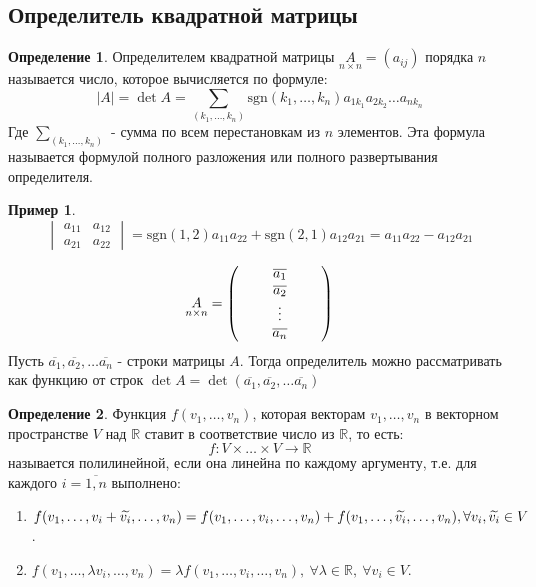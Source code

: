 \documentclass[a4paper, 12pt]{article}
\newcommand{\R}{\mathbb R}
\newcommand\tab[1][.5cm]{\hspace*{#1}}
\theoremstyle{definition}
\newtheorem*{definition}{Определение}
\newtheorem*{example1}{Пример}
\begin{document}
  \subsection{Определитель квадратной матрицы}
  \begin{definition}
    Определителем квадратной матрицы $\underset{n \times n}{A}=(a_{ij})$ порядка $n$ называется число, которое вычисляется по формуле:
    $$|A|=\det{A}=\sum\limits_{(k_1,\dots,k_n)}\textrm{sgn}(k_1,\dots,k_n)a_{1k_1}a_{2k_2}\dots a_{nk_n}$$
    Где $\sum\limits_{(k_1,\dots,k_n)}$ - сумма по всем перестановкам из $n$ элементов. Эта формула называется формулой полного разложения или полного развертывания определителя.
  \end{definition}
  \begin{example1}
    $$\begin{vmatrix}
      a_{11} & a_{12}\\
      a_{21} & a_{22}  
    \end{vmatrix} = \textrm{sgn}(1,2)a_{11}a_{22}+\textrm{sgn}(2,1)a_{12}a_{21}=a_{11}a_{22}-a_{12}a_{21}$$
  \end{example1}
  $$\underset{n \times n}{A}=\begin{pmatrix}
    \tab & \overline{a_1} & \tab\\
    \null & \overline{a_2} & \null\\
    \null & \vdots & \null\\
    \null & \overline{a_n} & \null
  \end{pmatrix}$$
  Пусть $\overline{a_1}, \overline{a_2}, \dots \overline{a_n}$ - строки матрицы $A$. Тогда определитель можно рассматривать как функцию от строк $\det{A}=\det{(\overline{a_1},\overline{a_2},\dots \overline{a_n})}$
  \begin{definition}
    Функция $f(v_1,\dots, v_n)$, которая векторам $v_1,\dots, v_n$ в векторном пространстве $V$ над $\R$ ставит в соответствие число из $\R$, то есть: $$f:V\times\dots\times V\to \R$$
    называется полилинейной, если она линейна по каждому аргументу, т.е. для каждого $i=\overline{1,n}$ выполнено:
    \begin{enumerate}
      \item $f(v_1,\dots, v_i+\widetilde{v_i},\dots, v_n)=f(v_1,\dots, v_i,\dots, v_n)+f(v_1,\dots, \widetilde{v_i},\dots, v_n),\\ \forall v_i, \widetilde{v_i}\in V$.
      \item $f(v_1,\dots, \lambda v_i,\dots, v_n)=\lambda f(v_1,\dots, v_i,\dots, v_n),\ \forall \lambda\in \R,\ \forall v_i\in V$.
    \end{enumerate}
  \end{definition}
\end{document}
